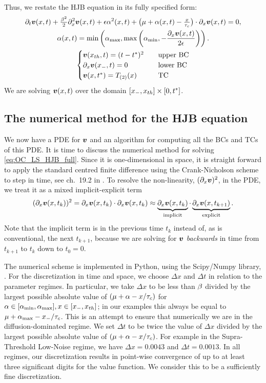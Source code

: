 \documentclass[12pt]{iopart}
\begin{document}
Thus, we restate the HJB equation in its fully specified form:
\begin{equation}
\begin{gathered}
{\partial}_t { \boldsymbol{v} }(x,t) + \tfrac{{\beta}^2}{2} {\partial}_x^2{ \boldsymbol{v} }(x,t)+
{\epsilon} {\alpha}^2(x,t) + \big({\mu } + {\alpha}(x,t) -\tfrac{x}{{ \tau_{c} }}\big)\cdot {\partial}_x{ \boldsymbol{v} }(x,t)
= 0,
\\
{\alpha} (x,t) = \min \left({ {\alpha}_{\textrm{max}} }, \max\left({ {\alpha}_{\textrm{min}} }, -\frac{{\partial}_x { \boldsymbol{v} }(x,t)}{2{\epsilon}}\right)
\right).
\\
\begin{cases}
{ \boldsymbol{v} }({ x_{th} },t) = (t-{ t^* })^2  \quad & \textrm{upper BC}
\\
{\partial}_x { \boldsymbol{v} }({ x_{-} }, t)  = 0  \quad &\textrm{lower BC}
\\
{ \boldsymbol{v} }(x,{ t^* })  =
{ {T}_{(2)} }(x)
\,& \textrm{TC}
\end{cases}
\end{gathered}
\label{eq:OC_LS_HJB_full}
\end{equation}
We are solving ${ \boldsymbol{v} }(x,t)$ over the domain $[{ x_{-} }, { x_{th} }] \times [0,{ t^* }]$.

\subsection{The numerical method for the HJB equation}
\label{sec:hjb_numerix}
We now have a PDE for ${ \boldsymbol{v} }$ and an algorithm for computing all the BCs and TCs of
this PDE. It is time to discuss the numerical method for solving
\cref{eq:OC_LS_HJB_full}. Since it is one-dimensional in space, it is straight
forward to apply the standard centred finite difference using the
Crank-Nicholson scheme to step in time, see ch.\ 19.2 in \cite{Press1992}. To
resolve the non-linearity, $({\partial}_x{ \boldsymbol{v} })^2$, in the PDE, we treat it as a mixed
implicit-explicit term $$({\partial}_x { \boldsymbol{v} }(x,t_k))^2 = {\partial}_x { \boldsymbol{v} }(x,t_k) \cdot {\partial}_x
{ \boldsymbol{v} }(x,t_k) \approx \underbrace{{\partial}_x { \boldsymbol{v} }(x,t_k)}_{\textrm{implicit}} \cdot
\underbrace{{\partial}_x{ \boldsymbol{v} }(x,t_{k+1})}_{\textrm{explicit}}.$$ Note that the implicit
term is in the previous time $t_k$ instead of, as is conventional, the next
$t_{k+1}$, because we are solving for ${ \boldsymbol{v} }$ {\sl backwards} in time from
$t_{k+1}$ to $t_k$ down to  $t_0 = 0$.

The numerical scheme is implemented in Python, using the Scipy/Numpy library,
\cite{Scipy}. For the discretization in time and space, we choose $\Delta x$ and
$\Delta t$ in relation to the parameter regimes. In particular, we take $\Delta
x$ to be less than ${\beta}$ divided by the largest possible absolute value of $({\mu } +
{\alpha} - x/{ \tau_{c} })$ for ${\alpha} \in [{ {\alpha}_{\textrm{min}} }, { {\alpha}_{\textrm{max}} }], x \in [{ x_{-} }, { x_{th} }]$; in our examples
this always be equal to $\mu + { {\alpha}_{\textrm{max}} } - { x_{-} }/{ \tau_{c} }$. This is an attempt to ensure
that numerically we are in the diffusion-dominated regime. We set $\Delta t$ to
be twice the value of $\Delta x$ divided by the largest possible absolute
value of $({\mu } + {\alpha} - x/{ \tau_{c} })$. For example in the Supra-Threshold Low-Noise regime, we
have $\Delta x = 0.0043$ and $\Delta t = 0.0013$. In all regimes, our
discretization results in point-wise convergence of up to at least three
significant digits for the value function. We consider this to be a sufficiently
fine discretization.
\end{document}
